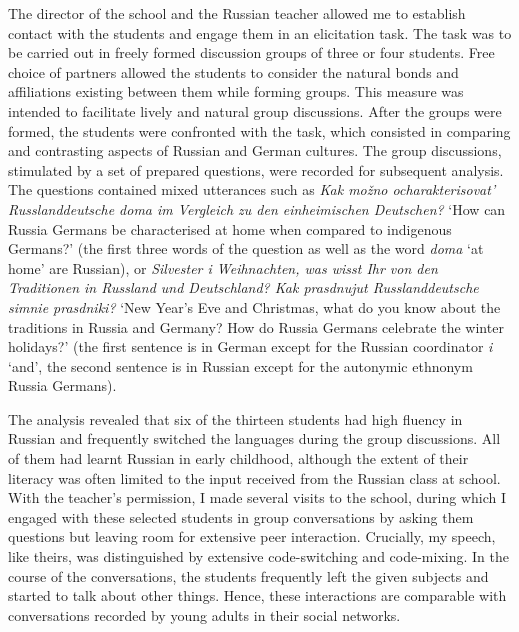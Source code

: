The director of the school and the Russian teacher allowed me to establish contact with the students and engage them in an elicitation task. The task was to be carried out in freely formed discussion groups of three or four students. Free choice of partners allowed the students to consider the natural bonds and affiliations existing between them while forming groups. This measure was intended to facilitate lively and natural group discussions. After the groups were formed, the students were confronted with the task, which consisted in comparing and contrasting aspects of Russian and German cultures. The group discussions, stimulated by a set of prepared questions, were recorded for subsequent analysis. The questions contained mixed utterances such as \textit{Kak mo\v{z}no ocharakterisovat' Russlanddeutsche doma im Vergleich zu den einheimischen Deutschen?} `How can Russia Germans be characterised at home when compared to indigenous Germans?' (the first three words of the question as well as the word \textit{doma} `at home' are Russian), or \textit{Silvester i Weihnachten, was wisst Ihr von den Traditionen in Russland und Deutschland? Kak prasdnujut Russlanddeutsche simnie prasdniki?} `New Year's Eve and Christmas, what do you know about the traditions in Russia and Germany? How do Russia Germans celebrate the winter holidays?' (the first sentence is in German except for the Russian coordinator \textit{i} `and', the second sentence is in Russian except for the autonymic ethnonym Russia Germans). 

The analysis revealed that six of the thirteen students had high fluency in Russian and frequently switched the languages during the group discussions. All of them had learnt Russian in early childhood, although the extent of their literacy was often limited to the input received from the Russian class at school. With the teacher's permission, I made several visits to the school, during which I engaged with these selected students in group conversations by asking them questions but leaving room for extensive peer interaction. Crucially, my speech, like theirs, was distinguished by extensive code-switching and code-mixing. In the course of the conversations, the students frequently left the given subjects and started to talk about other things. Hence, these interactions are comparable with conversations recorded by young adults in their social networks.

